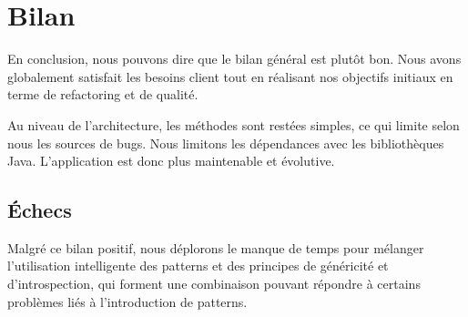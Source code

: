 \section{Bilan}

En conclusion, nous pouvons dire que le bilan général est plutôt bon. Nous avons globalement satisfait les besoins client tout en réalisant nos objectifs initiaux en terme de refactoring et de qualité.

Au niveau de l'architecture, les méthodes sont restées simples, ce qui limite selon nous les sources de bugs. Nous limitons les dépendances avec les bibliothèques Java. L'application est donc plus maintenable et évolutive.

\subsection{Échecs}

Malgré ce bilan positif, nous déplorons le manque de temps pour mélanger l'utilisation intelligente des patterns et des principes de généricité et d'introspection, qui forment une combinaison pouvant répondre à certains problèmes liés à l'introduction de patterns.

